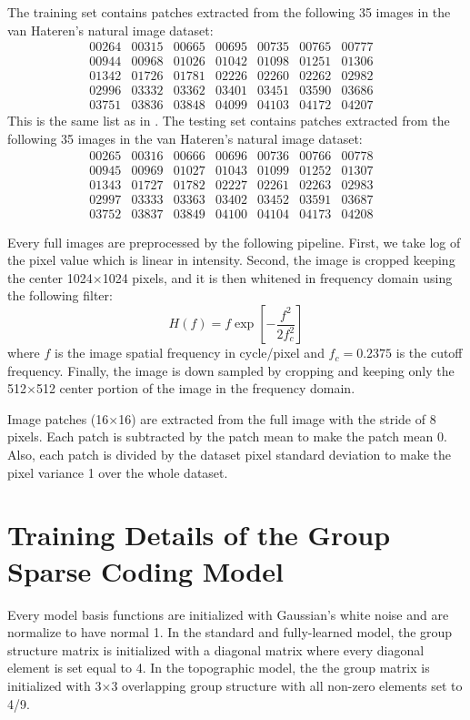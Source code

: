 The training set contains patches extracted from the following 35 images in the van Hateren's natural image dataset:
\[
\begin{matrix}
00264& 00315& 00665& 00695& 00735& 00765& 00777& \\
00944& 00968& 01026& 01042& 01098& 01251& 01306& \\
01342& 01726& 01781& 02226& 02260& 02262& 02982& \\
02996& 03332& 03362& 03401& 03451& 03590& 03686& \\
03751& 03836& 03848& 04099& 04103& 04172& 04207&
\end{matrix}
\]
This is the same list as in \cite{ob13}. The testing set contains patches extracted from the following 35 images in the van Hateren's natural image dataset:
\[
\begin{matrix}
00265& 00316& 00666& 00696& 00736& 00766& 00778& \\
00945& 00969& 01027& 01043& 01099& 01252& 01307& \\
01343& 01727& 01782& 02227& 02261& 02263& 02983& \\
02997& 03333& 03363& 03402& 03452& 03591& 03687& \\
03752& 03837& 03849& 04100& 04104& 04173& 04208&
\end{matrix}
\]

Every full images are preprocessed by the following pipeline. First, we take log of the pixel value which is linear in intensity. Second, the image is cropped keeping the center 1024$\times$1024 pixels, and it is then whitened in frequency domain using the following filter:
\begin{equation}
H(f) = f\exp\left[
	-\frac{f^2}{2f_c^2}
	\right]
\end{equation}
where $f$ is the image spatial frequency in cycle/pixel and $f_c = 0.2375$ is the cutoff frequency. Finally, the image is down sampled by cropping and keeping only the 512$\times$512 center portion of the image in the frequency domain.

Image patches (16$\times$16) are extracted from the full image with the stride of 8 pixels. Each patch is subtracted by the patch mean to make the patch mean 0. Also, each patch is divided by the dataset pixel standard deviation to make the pixel variance 1 over the whole dataset.

\section{Training Details of the Group Sparse Coding Model}
\label{app:train}
Every model basis functions are initialized with Gaussian's white noise and are normalize to have normal 1. In the standard and fully-learned model, the group structure matrix is initialized with a diagonal matrix where every diagonal element is set equal to 4. In the topographic model, the the group matrix is initialized with 3$\times$3 overlapping group structure with all non-zero elements set to 4/9.

